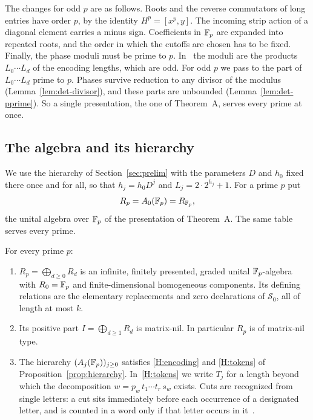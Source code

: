 The changes for odd $p$ are as follows. Roots and the reverse commutators of long entries have order $p$, by the
identity $H^p=[x^p,y]$. The incoming strip action of a diagonal element carries a minus sign. Coefficients in $\mathbb F_p$ are
expanded into repeated roots, and the order in which the cutoffs are chosen has to be fixed. Finally, the phase moduli
must be prime to $p$. In~\cite{OAI247rf} the moduli are the products $L_0\cdots L_d$ of the encoding lengths, which are
odd. For odd $p$ we pass to the part of $L_0\cdots L_d$ prime to $p$. Phases survive reduction to any divisor of the
modulus (Lemma~\ref{lem:det-divisor}), and these parts are unbounded (Lemma~\ref{lem:det-pprime}). So a single
presentation, the one of Theorem~A, serves every prime at once.

\subsection{The algebra and its hierarchy}

We use the hierarchy of Section~\ref{sec:prelim} with the parameters $D$ and $h_0$ fixed there once and for all, so
that $h_j=h_0D^j$ and $L_j=2\cdot2^{h_j}+1$. For a prime $p$ put
\[
 R_p=A_0(\mathbb F_p)=R_{\mathbb F_p},
\]
the unital algebra over $\mathbb F_p$ of the presentation of Theorem~A. The same table serves every prime.

\begin{proposition}\label{prop:det-input}
For every prime $p$:
\begin{enumerate}[label=\textup{(\alph*)}]
\item $R_p=\bigoplus_{d\geq0}R_d$ is an infinite, finitely presented, graded unital $\mathbb F_p$-algebra with $R_0=\mathbb F_p$ and
finite-dimensional homogeneous components. Its defining relations are the elementary replacements and zero declarations
of $\mathcal S_0$, all of length at most $k$.
\item Its positive part $I=\bigoplus_{d\geq1}R_d$ is matrix-nil. In particular $R_p$ is of matrix-nil type.
\item The hierarchy $(A_j(\mathbb F_p))_{j\geq0}$ satisfies \ref{H:encoding} and \ref{H:tokens} of
Proposition~\ref{prop:hierarchy}. In~\ref{H:tokens} we write $T_j$ for a length beyond which the decomposition
$w=p_w\,t_1\cdots t_r\,s_w$ exists. Cuts are recognized from single letters: a cut sits immediately before each
occurrence of a designated letter, and is counted in a word only if that letter occurs in it~\cite[Proposition~2.2(iii)]{OAI247rf}.
\end{enumerate}
\end{proposition}

